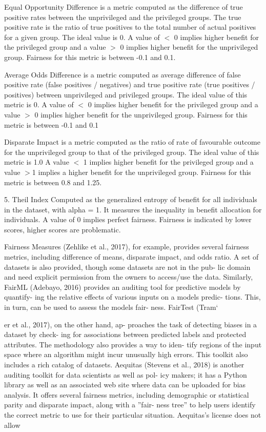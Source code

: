 \documentclass[sigconf,review]{acmart}
\begin{document}
Equal Opportunity Difference \cite{bellamy2018ai} is a metric computed as the difference of true positive rates between the unprivileged and the privileged groups. 
The true positive rate is the ratio of true positives to the total number of actual positives for a given group. The ideal value is 0. A value of $<$ 0 implies higher benefit for the privileged group and a value $>$ 0 implies higher benefit for the unprivileged group. Fairness for this metric is between -0.1 and 0.1.

Average Odds Difference \cite{bellamy2018ai} is a metric computed as average difference of false positive rate (false positives / negatives) and true positive rate (true positives / positives) between unprivileged and privileged groups.
The ideal value of this metric is 0. A value of $<$ 0 implies higher benefit for the privileged group and a value $>$ 0 implies higher benefit for the unprivileged group.
Fairness for this metric is between -0.1 and 0.1

Disparate Impact \cite{feldman2015disparate,bellamy2018ai} is a metric computed as the ratio of rate of favourable outcome for the unprivileged group to that of the privileged group.
The ideal value of this metric is 1.0 A value $<$ 1 implies higher benefit for the privileged group and a value $>$1 implies a higher benefit for the unprivileged group.
Fairness for this metric is between 0.8 and 1.25.

5. Theil Index \cite{conceicao2000theyoung,bellamy2018ai}
Computed as the generalized entropy of benefit for all individuals in the dataset, with alpha = 1. It measures the inequality in benefit allocation for individuals.
A value of 0 implies perfect fairness. Fairness is indicated by lower scores, higher scores are problematic.


Fairness Measures (Zehlike et al., 2017), for example,
provides several fairness metrics, including difference of
means, disparate impact, and odds ratio. A set of datasets
is also provided, though some datasets are not in the pub-
lic domain and need explicit permission from the owners
to access/use the data. Similarly, FairML (Adebayo, 2016)
provides an auditing tool for predictive models by quantify-
ing the relative effects of various inputs on a models predic-
tions. This, in turn, can be used to assess the models fair-
ness. FairTest (Tram`

er et al., 2017), on the other hand, ap-
proaches the task of detecting biases in a dataset by check-
ing for associations between predicted labels and protected
attributes. The methodology also provides a way to iden-
tify regions of the input space where an algorithm might
incur unusually high errors. This toolkit also includes a
rich catalog of datasets. Aequitas (Stevens et al., 2018) is
another auditing toolkit for data scientists as well as pol-
icy makers; it has a Python library as well as an associated
web site where data can be uploaded for bias analysis. It
offers several fairness metrics, including demographic or
statistical parity and disparate impact, along with a ”fair-
ness tree” to help users identify the correct metric to use for
their particular situation. Aequitas’s license does not allow
\end{document}
